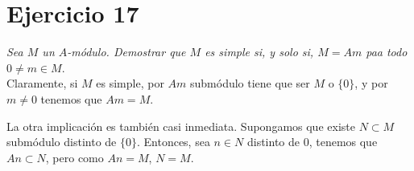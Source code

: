 \section{Ejercicio 17}%
\label{sec:ejercicio_17}
\textit{Sea \(M\) un \(A\)-módulo. Demostrar que \(M\) es simple si, y solo si, \(M = Am\) paa todo \(0\neq m \in M\)}.\\

Claramente, si \(M\) es simple, por \(Am\) submódulo tiene que ser \(M\) o  \(\{0\}\), y por  \(m\neq 0\) tenemos que  \(Am = M\).

La otra implicación es también casi inmediata. Supongamos que existe \(N \subset M\) submódulo distinto de \(\{0\}\). Entonces, sea \(n \in N\) distinto de  \(0\), tenemos que  \(An \subset N\), pero como  \(An = M\),  \(N = M\).
